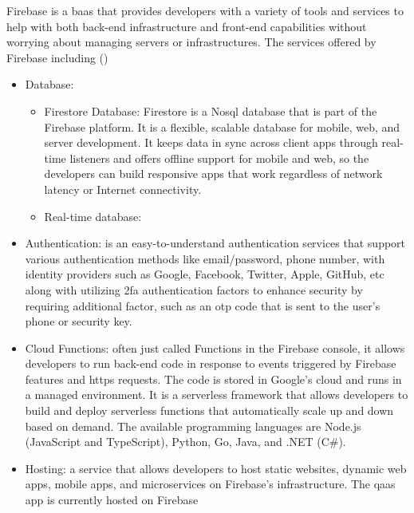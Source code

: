 \begin{multicols}{2}
      Firebase is a \acrshort{baas} that provides developers with a variety of tools and services to help with both
      back-end infrastructure and front-end capabilities without worrying about managing servers or infrastructures.
      The services offered by Firebase including (\cite{firebaseproducts})
      \begin{itemize}
            \item Database: 
            \begin{itemize}
                  \item Firestore Database: Firestore is a No\acrshort{sql} database that is part of the Firebase 
                  platform. It is a flexible, scalable database for mobile, web, and server development. It keeps 
                  data in sync across client apps through real-time listeners and offers offline support for mobile 
                  and web, so the developers can build responsive apps that work regardless of network latency or 
                  Internet connectivity.
                  \item Real-time database:
            \end{itemize}
            \item Authentication: is an easy-to-understand authentication services that support various authentication
                  methods like email/password, phone number, with identity providers such as Google, Facebook, Twitter,
                  Apple, GitHub, \acrshort{etc}
                  along with utilizing \acrshort{2fa} authentication factors to enhance security by requiring additional
                  factor, such as an \acrshort{otp} code that is sent to the user's phone or security key.
            \item Cloud Functions: often just called Functions in the Firebase console, it allows developers to run 
                  back-end code in response to events triggered by Firebase features and \acrshort{https} requests. 
                  The code is stored in Google's cloud and runs in a managed environment. It is a serverless framework
                  that allows developers to build and deploy serverless functions that automatically scale up and down
                  based on demand. The available programming languages are Node.js (JavaScript and TypeScript), Python, Go, 
                  Java, and .NET (C\#).
            \item Hosting: a service that allows developers to host static websites, dynamic web apps, mobile apps, and 
                  microservices on Firebase's infrastructure. The \acrshort{qaas} app is currently hosted on Firebase 

\end{itemize}
\end{multicols}
